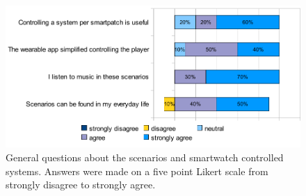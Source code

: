\begin{figure}[h]
	\myfloatalign
	\includegraphics[width=1\linewidth]{img/generalQuestionsPlot.pdf}
	\caption{General questions about the scenarios and smartwatch controlled systems. Answers were made on a five point Likert scale from strongly disagree to strongly agree.}
	\label{fig:scenarioQuestions}
\end{figure}

\newpage

